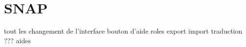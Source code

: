\section{SNAP}
tout les changement de l'interface
bouton d'aide
roles
export import
traduction ???
aides